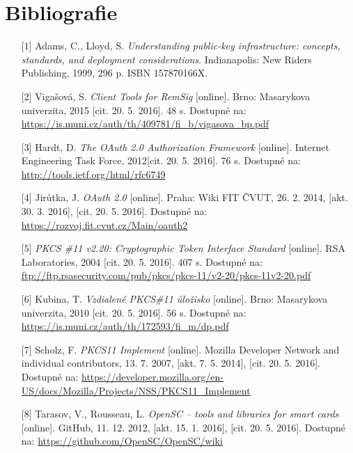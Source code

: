 \documentclass[]{fithesis3}
\begin{document}
\chapter{Bibliografie}
{\flushleft
\begin{itemize}
	
	\item[$\mbox{[1]}$] Adams, C., Lloyd, S. \textit{Understanding public-key infrastructure:
concepts, standards, and deployment considerations}. Indianapolis: New Riders Publishing, 1999, 296 p. ISBN 157870166X.

	\item[$\mbox{[2]}$] Vigašová, S. \textit{Client Tools for RemSig} [online]. Brno: Masarykova univerzita, 2015 [cit. 20. 5. 2016]. 48 s. Dostupné na: \url{https://is.muni.cz/auth/th/409781/fi_b/vigasova_bp.pdf}

	\item[$\mbox{[3]}$] Hardt, D. \textit{The OAuth 2.0 Authorization Framework} [online]. Internet Engineering Task Force, 2012[cit. 20. 5. 2016]. 76 s. Dostupné na: \url{http://tools.ietf.org/html/rfc6749}

	\item[$\mbox{[4]}$] Jirůtka, J. \textit{OAuth 2.0} [online]. Praha: Wiki FIT ČVUT, 26. 2. 2014, [akt. 30. 3. 2016], [cit. 20. 5. 2016].  Dostupné na: \url{https://rozvoj.fit.cvut.cz/Main/oauth2}

	\item[$\mbox{[5]}$] \textit{PKCS \#11 v2.20: Cryptographic Token Interface Standard} [online]. RSA Laboratories, 2004 [cit. 20. 5. 2016]. 407 s. Dostupné na: \url{ftp://ftp.rsasecurity.com/pub/pkcs/pkcs-11/v2-20/pkcs-11v2-20.pdf}

	\item[$\mbox{[6]}$] Kubina, T. \textit{Vzdialené PKCS\#11 úložisko} [online]. Brno: Masarykova univerzita, 2010 [cit. 20. 5. 2016]. 56 s. Dostupné na: \url{https://is.muni.cz/auth/th/172593/fi_m/dp.pdf}

	\item[$\mbox{[7]}$] Scholz, F. \textit{PKCS11 Implement} [online]. Mozilla Developer Network and individual contributors, 13. 7. 2007, [akt. 7. 5. 2014], [cit. 20. 5. 2016]. Dostupné na: \url{https://developer.mozilla.org/en-US/docs/Mozilla/Projects/NSS/PKCS11_Implement}

	\item[$\mbox{[8]}$]Tarasov, V., Rousseau, L. \textit{OpenSC – tools and libraries for smart cards} [online]. GitHub, 11. 12. 2012, [akt. 15. 1. 2016], [cit. 20. 5. 2016]. Dostupné na: \url{https://github.com/OpenSC/OpenSC/wiki}


\end{itemize}}
\end{document}
